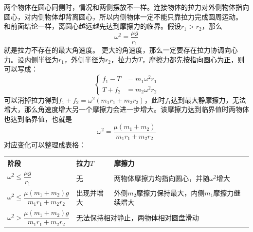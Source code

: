 \begin{casetypebox}[title={\strut\textcolor{white}{\bfseries 常见题型：同侧摆放物体}}]
  两个物体在圆心同侧时，情况和两侧摆放不一样。连接物体的拉力对外侧物体指向圆心，对内侧物体却背离圆心，所以内侧物体一定不能只靠拉力完成圆周运动。\\
  和前面结论一样，离圆心越远越先达到摩擦力的临界。假设$r_1>r_2$，那么\[\omega^2=\frac{\mu g}{r_1}\]就是拉力不存在的最大角速度。
  更大的角速度，那么一定要存在拉力协调向心力。设内侧半径为$r_1$，外侧半径为$r_2$，拉力为$T$，摩擦力都先按指向圆心为正，则可以写成：
  \[
    \left\{
    \begin{aligned}
      f_1-T & =m_1\omega^2r_1 \\
      T+f_2 & =m_2\omega^2r_2
    \end{aligned}\right.
  \]
  可以消掉拉力得到$f_1+f_2=\omega^2(m_1r_1+m_2r_2)$，此时$f_1$达到最大静摩擦力，无法增大，那么角速度增大另一个摩擦力会进一步增大。该摩擦力达到临界值时两物体也达到临界值，也就是\[\omega^2=\frac{\mu(m_1+m_2)}{m_1r_1+m_2r_2}\]
  对应变化可以整理成表格：
  \begin{center}
    \begingroup
    \small
    \begin{tabular}{|p{}|p{}|p{}|}
      \hline
      阶段 & 拉力$T$ & 摩擦力 \\
      \hline
      $\omega^2\leq\dfrac{\mu g}{r_1}$ & 无 & 两物体摩擦力均指向圆心，并随$\omega^2$增大\\
      \hline
      $\omega^2\leq\dfrac{\mu(m_1+m_2)g}{m_1r_1+m_2r_2}$ & 出现并增大 & 外侧$m_2$摩擦力保持最大，内侧$m_1$摩擦力继续增大 \\
      \hline
      $\omega^2>\dfrac{\mu(m_1+m_2)g}{m_1r_1+m_2r_2}$& \multicolumn{2}{|p{0.56\columnwidth}|}{无法保持相对静止，两物体相对圆盘滑动}\\
      \hline
    \end{tabular}
    \endgroup
  \end{center}
\end{casetypebox}